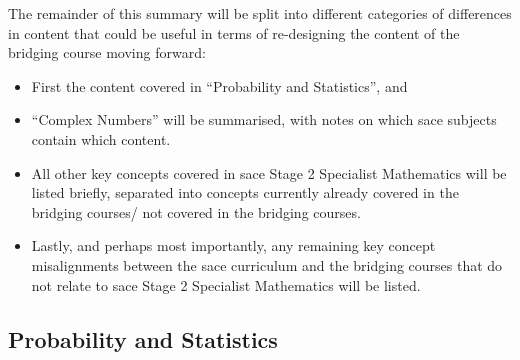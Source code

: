 \documentclass[twoside,12pt,a4paper]{report}
\begin{document}
The remainder of this summary will be split into different categories of differences in content that could be useful in terms of re-designing the content of the bridging course moving forward:
\begin{itemize}
	\item First the content covered in ``Probability and Statistics'', and
	\item ``Complex Numbers'' will be summarised, with notes on which \gls{sace} subjects contain which content.
	\item All other key concepts covered in \gls{sace} Stage 2 Specialist Mathematics will be listed briefly, separated into concepts currently already covered in the bridging courses/ not covered in the bridging courses. 
	\item Lastly, and perhaps most importantly, any remaining key concept misalignments between the \gls{sace} curriculum and the bridging courses that do not relate to \gls{sace} Stage 2 Specialist Mathematics will be listed.
\end{itemize}

\subsection{Probability and Statistics}
\end{document}
